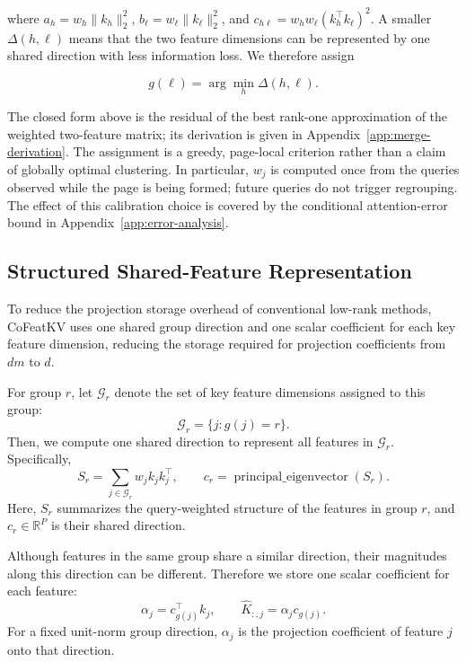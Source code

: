 \documentclass{article} %
\begin{document}
where
$a_h=w_h\|k_h\|_2^2$,
$b_\ell=w_\ell\|k_\ell\|_2^2$, and
$c_{h\ell}=w_hw_\ell(k_h^\top k_\ell)^2$.
A smaller $\Delta(h,\ell)$ means that the two feature dimensions can be
represented by one shared direction with less information loss. We therefore
assign

\begin{equation}
g(\ell)=\arg\min_h\Delta(h,\ell).
\end{equation}

The closed form above is the residual of the best rank-one approximation of
the weighted two-feature matrix; its derivation is given in
Appendix~\ref{app:merge-derivation}. The assignment is a greedy,
page-local criterion rather than a claim of globally optimal clustering. In
particular, $w_j$ is computed once from the queries observed while the page is
being formed; future queries do not trigger regrouping. The effect of this
calibration choice is covered by the conditional attention-error bound in
Appendix~\ref{app:error-analysis}.


\subsection{Structured Shared-Feature Representation}

To reduce the projection storage overhead of conventional low-rank methods,
CoFeatKV uses one shared group direction and one scalar coefficient for each
key feature dimension, reducing the storage required for projection
coefficients from $dm$ to $d$.

For group $r$, let $\mathcal{G}_r$ denote the set of key feature dimensions
assigned to this group:
\begin{equation}
    \mathcal{G}_r=\{j:g(j)=r\}.
\end{equation}
Then, we compute one shared direction to represent all features in
$\mathcal{G}_r$. Specifically,
\begin{equation}
    S_r=\sum_{j\in\mathcal{G}_r} w_j k_jk_j^\top,
    \qquad
    c_r=\operatorname{principal\_eigenvector}(S_r).
    \label{eq:group-direction}
\end{equation}
Here, $S_r$ summarizes the query-weighted structure of the features in group
$r$, and $c_r\in\mathbb{R}^{P}$ is their shared direction.

Although features in the same group share a similar direction, their
magnitudes along this direction can be different. Therefore we store one
scalar coefficient for each feature:
\begin{equation}
    \alpha_j=c_{g(j)}^\top k_j,
    \qquad
    \widehat K_{:,j}=\alpha_j c_{g(j)}.
    \label{eq:feature-approximation}
\end{equation}
For a fixed unit-norm group direction, $\alpha_j$ is the projection coefficient
of feature $j$ onto that direction.
\end{document}
